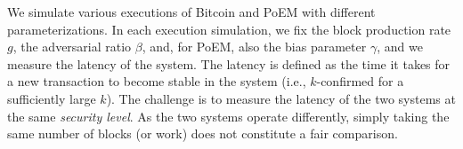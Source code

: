 %
%
%

We simulate various executions of Bitcoin and PoEM with different parameterizations.
In each execution simulation, we fix the block production rate $g$, the adversarial ratio $\beta$,
and, for PoEM, also the bias parameter $\gamma$, and we
measure the latency of the system. The latency is defined as the time it takes for a new transaction
to become stable in the system (i.e., $k$-confirmed for a sufficiently large $k$).
The challenge is to measure the latency of the two
systems at the same \emph{security level}. As the two systems operate differently, simply
taking the same number of blocks (or work) does not constitute a fair comparison.

